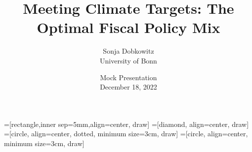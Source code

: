 \documentclass[11pt,aspectratio=169]{beamer}
\author[Sonja Dobkowitz]{\small Sonja Dobkowitz\\ \footnotesize{University of Bonn%
}\\ }
\title{Meeting Climate Targets: The Optimal Fiscal Policy Mix}
\date{\small{Mock Presentation\\ December 18, 2022 }}
\begin{document}
=[rectangle,inner sep=5mm,align=center, draw]
=[diamond, align=center, draw]
=[circle, align=center, dotted, minimum size=3cm, draw]
=[circle, align=center, minimum size=3cm, draw]
{
	\begin{frame}
		\titlepage
	\end{frame}
}




%	
\end{document}
